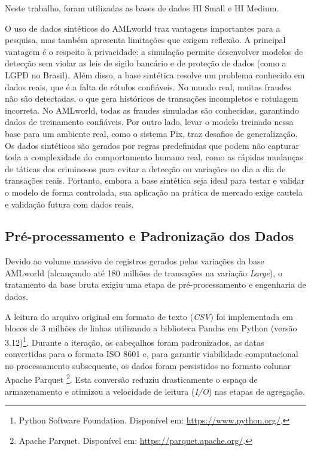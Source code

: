 \documentclass[titlepage,a4paper,oneside,onecolumn,12pt]{report}
\begin{document}
Neste trabalho, foram utilizadas as bases de dados HI Small e HI Medium.

O uso de dados sintéticos do AMLworld traz vantagens importantes para a pesquisa, mas também apresenta limitações que exigem reflexão. A principal vantagem é o respeito à privacidade: a simulação permite desenvolver modelos de detecção sem violar as leis de sigilo bancário e de proteção de dados (como a LGPD no Brasil). Além disso, a base sintética resolve um problema conhecido em dados reais, que é a falta de rótulos confiáveis. No mundo real, muitas fraudes não são detectadas, o que gera históricos de transações incompletos e rotulagem incorreta. No AMLworld, todas as fraudes simuladas são conhecidas, garantindo dados de treinamento confiáveis. Por outro lado, levar o modelo treinado nessa base para um ambiente real, como o sistema Pix, traz desafios de generalização. Os dados sintéticos são gerados por regras predefinidas que podem não capturar toda a complexidade do comportamento humano real, como as rápidas mudanças de táticas dos criminosos para evitar a detecção ou variações no dia a dia de transações reais. Portanto, embora a base sintética seja ideal para testar e validar o modelo de forma controlada, sua aplicação na prática de mercado exige cautela e validação futura com dados reais.

\subsection{Pré-processamento e Padronização dos Dados}

Devido ao volume massivo de registros gerados pelas variações da base AMLworld (alcançando até 180 milhões de transações na variação \textit{Large}), o tratamento da base bruta exigiu uma etapa de pré-processamento e engenharia de dados.

A leitura do arquivo original em formato de texto (\textit{CSV}) foi implementada em blocos de 3 milhões de linhas utilizando a biblioteca Pandas em Python (versão 3.12)\footnote{Python Software Foundation. Disponível em: \url{https://www.python.org/}.}. Durante a iteração, os cabeçalhos foram padronizados, as datas convertidas para o formato ISO 8601 e, para garantir viabilidade computacional no processamento subsequente, os dados foram persistidos no formato colunar Apache Parquet \footnote{Apache Parquet. Disponível em: \url{https://parquet.apache.org/}.}. Esta conversão reduziu drasticamente o espaço de armazenamento e otimizou a velocidade de leitura (\textit{I/O}) nas etapas de agregação.
\end{document}
